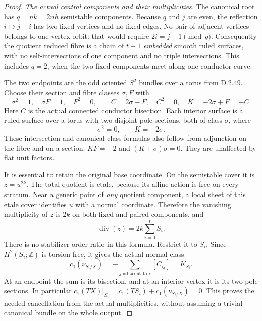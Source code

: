 \begin{proof}
\emph{The actual central components and their multiplicities.}
The canonical root has $q=nk=2nh$ semistable components. Because $q$
and $j$ are even, the reflection $i\mapsto j-i$ has two fixed
vertices and no fixed edges. No pair of adjacent vertices belongs to
one vertex orbit: that would require $2i=j\pm1\pmod q$.
Consequently the quotient reduced fibre is a chain of $t+1$
\emph{embedded} smooth ruled surfaces, with no self-intersections of
one component and no triple intersections. This includes $q=2$,
when the two fixed components meet along one conductor curve.

The two endpoints are the odd oriented $S^2$ bundles over a torus
from D.2.49. Choose their section and fibre classes $\sigma,F$ with
\[
 \sigma^2=1,\quad \sigma F=1,\quad F^2=0,\qquad
 C=2\sigma-F,\quad C^2=0,\quad K=-2\sigma+F=-C.
                                                               \tag{D.SS6}
\]
Here $C$ is the actual connected conductor bisection. Each interior
surface is a ruled surface over a torus with two disjoint pole
sections, both of class $\sigma$, where
\[
       \sigma^2=0,\qquad K=-2\sigma.                     \tag{D.SS7}
\]
These intersection and canonical-class formulas also follow from
adjunction on the fibre and on a section: $KF=-2$ and
$(K+\sigma)\sigma=0$. They are unaffected by flat unit factors.

It is essential to retain the original base coordinate. On the
semistable cover it is $z=u^{2k}$. The total quotient is etale,
because its affine action is free on every stratum. Near a generic
point of \emph{any} quotient component, a local sheet of this
etale cover identifies $u$ with a normal coordinate. Therefore
the vanishing multiplicity of $z$ is $2k$ on both fixed and paired
components, and
\[
                       \operatorname{div}(z)=2k\sum_{i=0}^t S_i.
                                                               \tag{D.SS8}
\]
There is no stabilizer-order ratio in this formula. Restrict it to
$S_i$. Since $H^2(S_i;\mathbb Z)$ is torsion-free, it gives the
actual normal class
\[
 c_1(\nu_{S_i/X})=-\sum_{j\text{ adjacent to }i}[C_{ij}]
                      =K_{S_i}.                          \tag{D.SS9}
\]
At an endpoint the sum is its bisection, and at an interior vertex
it is its two pole sections. In particular
$c_1(TX)|_{S_i}=c_1(TS_i)+c_1(\nu_{S_i/X})=0$.
This proves the needed cancellation from the actual multiplicities,
without assuming a trivial canonical bundle on the whole output.


\end{proof}
